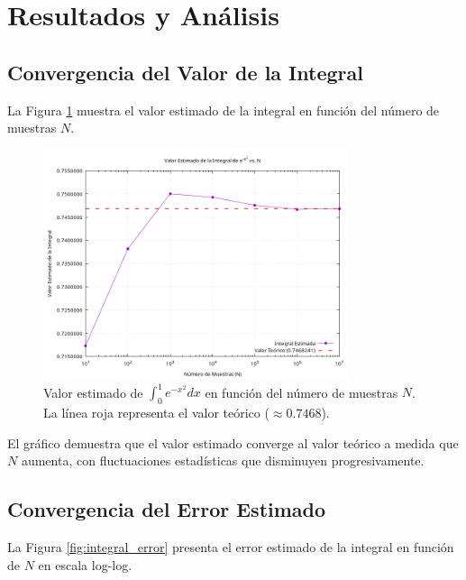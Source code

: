 \documentclass[11pt,a4paper]{article}
\begin{document}
\section{Resultados y Análisis}

\subsection{Convergencia del Valor de la Integral}
La Figura \ref{fig:integral_valor} muestra el valor estimado de la integral en función del número de muestras $N$.

\begin{figure}[h!]
    \centering
    \includegraphics[width=0.8\textwidth]{../results/integral_mc_exp_neg_x2_valor_vs_N.png}
    \caption{Valor estimado de $\int_0^1 e^{-x^2}dx$ en función del número de muestras $N$. La línea roja representa el valor teórico ($\approx 0.7468$).}
    \label{fig:integral_valor}
\end{figure}

El gráfico demuestra que el valor estimado converge al valor teórico a medida que $N$ aumenta, con fluctuaciones estadísticas que disminuyen progresivamente.

\subsection{Convergencia del Error Estimado}
La Figura \ref{fig:integral_error} presenta el error estimado de la integral en función de $N$ en escala log-log.
\end{document}
